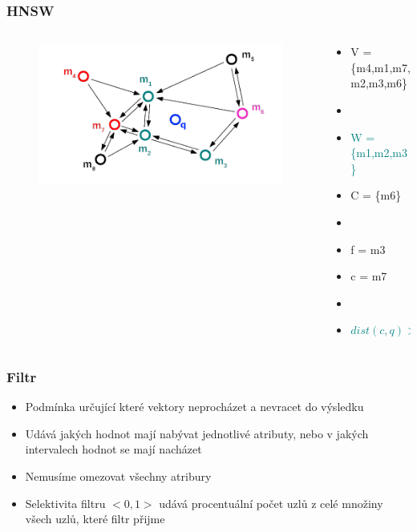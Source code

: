 \documentclass{beamer}
\begin{document}
	\begin{frame}
		\frametitle{HNSW}
		\begin{columns}[T] %
			\begin{column}{.6\textwidth}
				\begin{figure}
					\includegraphics[scale=0.3]{figures/HNSW_b12.png}
				\end{figure}
			\end{column}%
			\hfill%
			\begin{column}{.4\textwidth}
				\begin{itemize}
					\item V = \{m4,m1,m7,m2,m3,m6\}
					\item[]
					\item \textcolor{teal}{W = \{m1,m2,m3\}}
					\item C = \{m6\}
					\item[]
					\item f = m3
					\item c = m7
					\item[]
					\item \textcolor{teal}{$dist(c,q) > dist(f,q)$}
				\end{itemize}
			\end{column}%
		\end{columns}
	\end{frame}

	\begin{frame}
		\frametitle{Filtr}
		
		\begin{itemize}
			\item Podmínka určující které vektory neprocházet a nevracet do výsledku
			\item Udává jakých hodnot mají nabývat jednotlivé atributy, nebo v jakých intervalech hodnot se mají nacházet
			\item Nemusíme omezovat všechny atribury
			\item Selektivita filtru $<0,1>$ udává procentuální počet uzlů z celé množiny všech uzlů, které filtr přijme
			
		\end{itemize}
		
	\end{frame}
\end{document}
